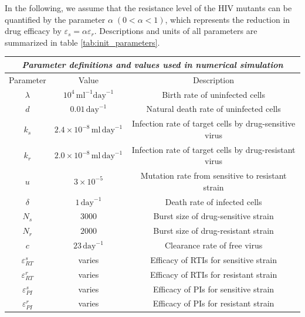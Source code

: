In the following, we assume that the resistance level of the HIV mutants can be quantified by the parameter $\alpha\; (0 < \alpha < 1)$, 
which represents the reduction in drug efficacy by $\varepsilon_{s} = \alpha \varepsilon_{r}$.\newline
Descriptions and units of all parameters are summarized in table \ref{tab:init_parameters}.\par

\renewcommand{\arraystretch}{1.25}
\begin{table}
    \centering
        \begin{tabular}{ ccc }
        \hline
        \hline
        \multicolumn{3}{c}{\textit{Parameter definitions and values used in numerical simulation}} \\
        \hline
        Parameter & Value & Description\\[0.5ex]
        \hline
        $\lambda$   & $10^4\,\text{ml}^{-1}\text{day}^{-1}$ & Birth rate of uninfected cells\\
        $d$   & $0.01\,\text{day}^{-1}$  & Natural death rate of uninfected cells\\
        $k_s$   & $2.4 \times 10^{-8}\,\text{ml}\,\text{day}^{-1}$  & Infection rate of target cells by drug-sensitive virus\\
        $k_r$   & $2.0 \times 10^{-8}\,\text{ml}\,\text{day}^{-1}$  & Infection rate of target cells by drug-resistant virus\\
        $u$   & $3 \times 10^{-5}$  & Mutation rate from sensitive to resistant strain\\
        $\delta$   & $1\,\text{day}^{-1}$  & Death rate of infected cells\\
        $N_s$   & $3000$  & Burst size of drug-sensitive strain\\
        $N_r$   & $2000$ & Burst size of drug-resistant strain\\
        $c$   & $23\, \text{day}^{-1}$  & Clearance rate of free virus\\
        $\varepsilon_{RT}^{s}$   & varies & Efficacy of RTIs for sensitive strain\\
        $\varepsilon_{RT}^{r}$   & varies & Efficacy of RTIs for resistant strain\\
        $\varepsilon_{PI}^{s}$   & varies & Efficacy of PIs for sensitive strain\\
        $\varepsilon_{PI}^{r}$   & varies & Efficacy of PIs for resistant strain\\

\end{tabular}
\end{table}
